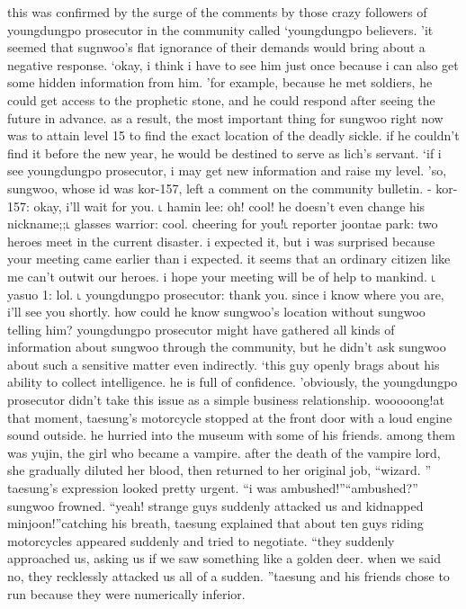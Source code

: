  this was confirmed by the surge of the comments by those crazy followers of youngdungpo prosecutor in the community called ‘youngdungpo believers.
’it seemed that sugnwoo’s flat ignorance of their demands would bring about a negative response.
‘okay, i think i have to see him just once because i can also get some hidden information from him.
’for example, because he met soldiers, he could get access to the prophetic stone, and he could respond after seeing the future in advance.
as a result, the most important thing for sungwoo right now was to attain level 15 to find the exact location of the deadly sickle.
 if he couldn’t find it before the new year, he would be destined to serve as lich’s servant.
‘if i see youngdungpo prosecutor, i may get new information and raise my level.
’so, sungwoo, whose id was kor-157, left a comment on the community bulletin.
- kor-157: okay, i’ll wait for you.
˪ hamin lee: oh! cool! he doesn’t even change his nickname;;˪ glasses warrior: cool.
 cheering for you!˪ reporter joontae park: two heroes meet in the current disaster.
 i expected it, but i was surprised because your meeting came earlier than i expected.
 it seems that an ordinary citizen like me can’t outwit our heroes.
 i hope your meeting will be of help to mankind.
˪ yasuo 1: lol.
˪ youngdungpo prosecutor: thank you.
 since i know where you are, i’ll see you shortly.
how could he know sungwoo’s location without sungwoo telling him? youngdungpo prosecutor might have gathered all kinds of information about sungwoo through the community, but he didn’t ask sungwoo about such a sensitive matter even indirectly.
‘this guy openly brags about his ability to collect intelligence.
 he is full of confidence.
’obviously, the youngdungpo prosecutor didn’t take this issue as a simple business relationship.
wooooong!at that moment, taesung’s motorcycle stopped at the front door with a loud engine sound outside.
 he hurried into the museum with some of his friends.
among them was yujin, the girl who became a vampire.
 after the death of the vampire lord, she gradually diluted her blood, then returned to her original job, “wizard.
”
taesung’s expression looked pretty urgent.
“i was ambushed!”“ambushed?” sungwoo frowned.
“yeah! strange guys suddenly attacked us and kidnapped minjoon!”catching his breath, taesung explained that about ten guys riding motorcycles appeared suddenly and tried to negotiate.
“they suddenly approached us, asking us if we saw something like a golden deer.
 when we said no, they recklessly attacked us all of a sudden.
”taesung and his friends chose to run because they were numerically inferior.
